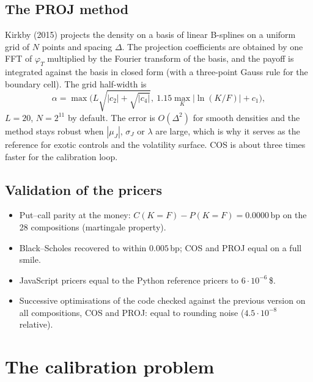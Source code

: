\documentclass[11pt,a4paper]{article}
\theoremstyle{definition}
\theoremstyle{remark}
\begin{document}
\subsection{The PROJ method}
Kirkby (2015) projects the density on a basis of linear B-splines on a uniform grid of $N$ points and spacing $\Delta$. The
projection coefficients are obtained by one FFT of $\varphi_T$ multiplied by the Fourier transform of the basis, and the payoff
is integrated against the basis in closed form (with a three-point Gauss rule for the boundary cell). The grid half-width is
\begin{equation}
  \alpha=\max\Big(L\sqrt{|c_2|+\sqrt{|c_4|}},\ 1.15\max_K|\ln(K/F)|+c_1\Big),
\end{equation}
$L=20$, $N=2^{11}$ by default. The error is $O(\Delta^2)$ for smooth densities and the method stays robust when $|\mu_J|$,
$\sigma_J$ or $\lambda$ are large, which is why it serves as the reference for exotic controls and the volatility surface. COS
is about three times faster for the calibration loop.

\subsection{Validation of the pricers}
\begin{itemize}[nosep]
  \item Put--call parity at the money: $C(K=F)-P(K=F)=0.0000$\,bp on the 28 compositions (martingale property).
  \item Black--Scholes recovered to within $0.005$\,bp; COS and PROJ equal on a full smile.
  \item JavaScript pricers equal to the Python reference pricers to $6\cdot10^{-6}$\,\$.
  \item Successive optimisations of the code checked against the previous version on all compositions, COS and PROJ: equal to
        rounding noise ($4.5\cdot10^{-8}$ relative).
\end{itemize}

\section{The calibration problem}\label{sec:calib}
\end{document}
